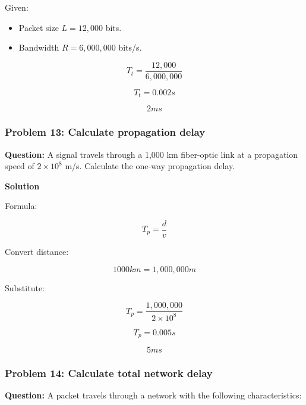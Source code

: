 Given:

\begin{itemize}
\item Packet size $L=12,000$ bits.
\item Bandwidth $R=6,000,000$ bits/s.
\end{itemize}



\[
T_t=\frac{12,000}{6,000,000}
\]





\[
T_t=0.002s
\]





\[
\boxed{2ms}
\]



\subsubsection*{Problem 13: Calculate propagation delay}

\textbf{Question:} A signal travels through a 1,000 km fiber-optic link at a propagation speed of $2\times10^8$ m/s. Calculate the one-way propagation delay.

\textbf{Solution}

Formula:



\[
T_p=\frac{d}{v}
\]



Convert distance:



\[
1000km=1,000,000m
\]



Substitute:



\[
T_p=\frac{1,000,000}{2\times10^8}
\]





\[
T_p=0.005s
\]





\[
\boxed{5ms}
\]



\subsubsection*{Problem 14: Calculate total network delay}

\textbf{Question:} A packet travels through a network with the following characteristics:

